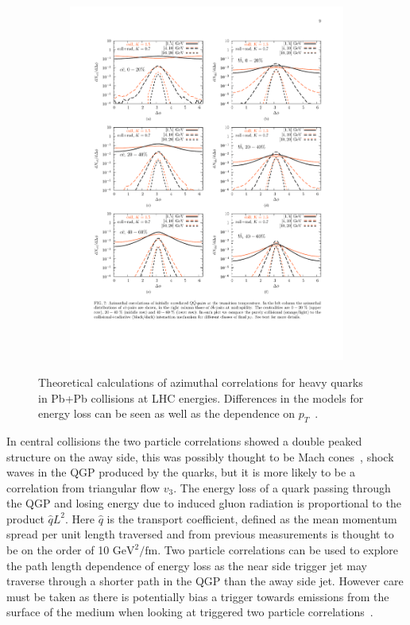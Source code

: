 \begin{figure}[htbp]
\begin{center}
\begin{subfigure}{0.75\textwidth}
        \includegraphics[width=\textwidth]{Plots/Intro/bb_cent.pdf}
        \caption{}
        \label{fig:bbbarcent}
    \end{subfigure}
	\end{center}
\caption[Correlations $c$ and $b$ at LHC Energies]{Theoretical calculations of azimuthal correlations for heavy quarks in Pb+Pb collisions at LHC energies. Differences in the models for energy loss can be seen as well as the dependence on $p_{T}$~\cite{qqazi}.}
\label{fig:qqcorr}
\end{figure}

In central collisions the two particle correlations showed a double peaked structure on the away side, this was possibly thought to be Mach cones~\cite{mcone}, shock waves in the QGP produced by the quarks, but it is more likely to be a correlation from triangular flow $v_3$. The energy loss of a quark passing through the QGP and losing energy due to induced gluon radiation is proportional to the product $\hat{q}L^2$. Here $\hat{q}$ is the transport coefficient, defined as the mean momentum spread per unit length traversed and from previous measurements is thought to be on the order of 10 $\text{GeV}^2/\text{fm}$. Two particle correlations can be used to explore the path length dependence of energy loss as the near side trigger jet may traverse through a shorter path in the QGP than the away side jet. However care must be taken as there is potentially bias a trigger towards emissions from the surface of the medium when looking at triggered two particle correlations~\cite{biasshower}. 

